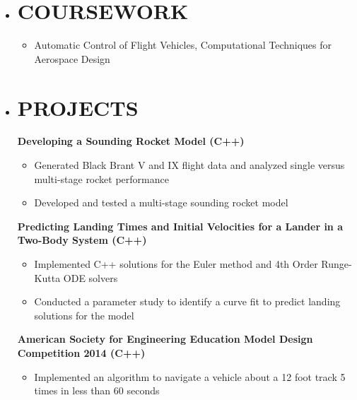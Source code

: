 \documentclass[overlapped, 11pt]{res}
\begin{document}
\begin{resume}
\begin{itemize}
    \item[]\section{COURSEWORK}
        \begin{itemize}
            \item[] Automatic Control of Flight Vehicles, Computational Techniques for Aerospace Design
        \end{itemize}

    \item[]\section{PROJECTS}
        \textbf{Developing a Sounding Rocket Model (C++)}
            \begin{itemize}
                \item Generated Black Brant V and IX flight data and analyzed single versus multi-stage rocket performance
                \item Developed and tested a multi-stage sounding rocket model
            \end{itemize}

        \vspace{0.5em}
        \textbf{Predicting Landing Times and Initial Velocities for a Lander in a Two-Body System (C++)}
            \begin{itemize}
                \item Implemented C++ solutions for the Euler method and 4th Order Runge-Kutta ODE solvers
                \item Conducted a parameter study to identify a curve fit to predict landing solutions for the model
            \end{itemize}

        \vspace{0.5em}
        \textbf{American Society for Engineering Education Model Design Competition 2014 (C++)}
            \begin{itemize}
                \item Implemented an algorithm to navigate a vehicle about a 12 foot track 5 times in less than 60 seconds
            \end{itemize}


\end{itemize}
\end{resume}
\end{document}
